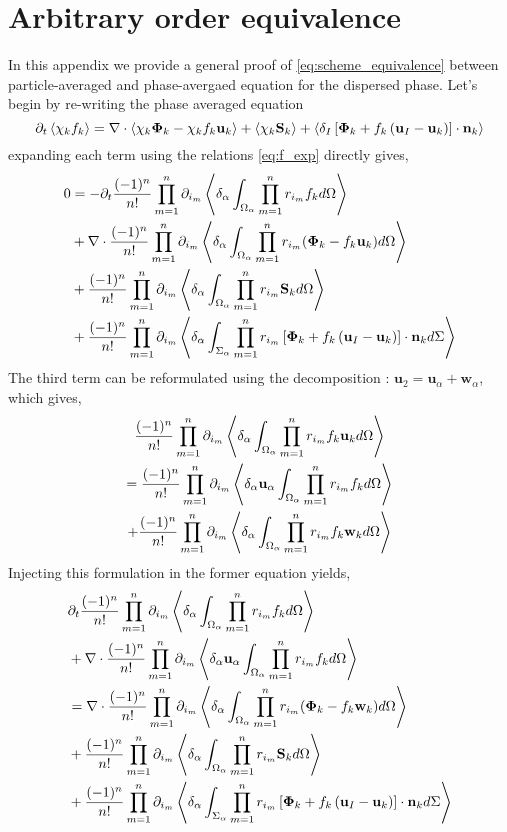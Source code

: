 \section{Arbitrary order equivalence}
\label{sec:demo}
In this appendix we provide a general proof of \ref{eq:scheme_equivalence} between particle-averaged and phase-avergaed equation for the dispersed phase. 
Let's begin by re-writing the phase averaged equation
\begin{equation}
        \pddt \avg{\chi_k f_k}
        = \div \avg{\chi_k \mathbf{\Phi}_k - \chi_k f_k \textbf{u}_k}
        + \avg{\chi_k \textbf{S}_k}
        + \avg{\delta_I\left[
            \mathbf{\Phi}_k
            + f_k
            \left(
                \textbf{u}_I
                - \textbf{u}_k
            \right)
        \right]
        \cdot \textbf{n}_k} 
\end{equation}
expanding each term using the relations \ref{eq:f_exp} directly gives,
\begin{align*}
        0 &=
        - \pddt \expo{f_k} \\
        &+\div \expo{(\mathbf{\Phi}_k - f_k \textbf{u}_k)}\\
        &+ \expo{ \textbf{S}_k}\\
        &+ \expoS{\left[
            \mathbf{\Phi}_k
            + f_k
            \left(
                \textbf{u}_I
                - \textbf{u}_k
            \right)
        \right]
        \cdot \textbf{n}_k} \\
\end{align*}
The third term can be reformulated using the decomposition : $\textbf{u}_2 = \textbf{u}_\alpha + \textbf{w}_\alpha$, which gives,
\begin{multline}
    \expo{f_k \textbf{u}_k}\\
    =     \expoU{f_k }\\
    +     \expo{f_k \textbf{w}_k}
\end{multline}
Injecting this formulation in the former equation yields,
\begin{align}
    & \pddt \expo{f_k} \\
    &+ \div \expoU{f_k}\\
    &= \div \expo{(\mathbf{\Phi}_k - f_k \textbf{w}_k)}\\
    &+ \expo{ \textbf{S}_k}\\
    &+ \expoS{\left[
        \mathbf{\Phi}_k
        + f_k
        \left(
            \textbf{u}_I
            - \textbf{u}_k
        \right)
    \right]
    \cdot \textbf{n}_k} \\
\end{align}
